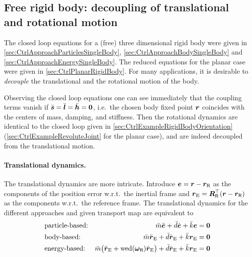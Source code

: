 \subsection{Free rigid body: decoupling of translational and rotational motion}\label{sec:DecouplingRigidBody}
The closed loop equations for a (free) three dimensional rigid body were given in \autoref{sec:CtrlApproachParticlesSingleBody}, \autoref{sec:CtrlApproachBodySingleBody} and \autoref{sec:CtrlApproachEnergySingleBody}.
The reduced equations for the planar case were given in \autoref{sec:CtrlPlanarRigidBody}.
For many applications, it is desirable to \textit{decouple} the translational and the rotational motion of the body.

Observing the closed loop equations one can see immediately that the coupling terms vanish if $\bar{\boldsymbol{s}}=\bar{\boldsymbol{l}}=\bar{\boldsymbol{h}}=\boldsymbol{0}$, i.e.\ the chosen body fixed point $\boldsymbol{r}$ coincides with the centers of mass, damping, and stiffness.
Then the rotational dynamics are identical to the closed loop given in \autoref{sec:CtrlExampleRigidBodyOrientation} (\autoref{sec:CtrlExampleRevoluteJoint} for the planar case), and are indeed decoupled from the translational motion.

\paragraph{Translational dynamics.}
The translational dynamics are more intricate.
Introduce $\boldsymbol{e} = \boldsymbol{r}-\boldsymbol{r}_{\mathsf{R}}$ as the components of the position error w.r.t.\ the inertial frame and $\boldsymbol{r}_{\mathrm{E}} = \boldsymbol{R}_{\mathsf{R}}^\top(\boldsymbol{r}-\boldsymbol{r}_{\mathsf{R}})$ as the components w.r.t.\ the reference frame.
The translational dynamics for the different approaches and given transport map are equivalent to
\begin{subequations}\label{eq:RigidBodyPosErrorDyn}
\begin{align}
 &\text{particle-based:}&
 \bar{m}\ddot{\boldsymbol{e}} + \bar{d}\dot{\boldsymbol{e}} + \bar{k}\boldsymbol{e} &= \boldsymbol{0}
\\
 &\text{body-based:}&
 \bar{m}\ddot{\boldsymbol{r}}_{\mathrm{E}} + \bar{d}\dot{\boldsymbol{r}}_{\mathrm{E}} + \bar{k}\boldsymbol{r}_{\mathrm{E}} &= \boldsymbol{0}
\\
 &\text{energy-based:}&
 \bar{m} \big(\ddot{\boldsymbol{r}}_{\mathrm{E}} + \operatorname{wed}(\boldsymbol{\omega}_{\mathsf{R}}) \dot{\boldsymbol{r}}_{\mathrm{E}} \big) + \bar{d}\dot{\boldsymbol{r}}_{\mathrm{E}} + \bar{k}\boldsymbol{r}_{\mathrm{E}} &= \boldsymbol{0}
 \label{eq:RigidBodyPosErrorDynApproach1}
\end{align}
\end{subequations}

